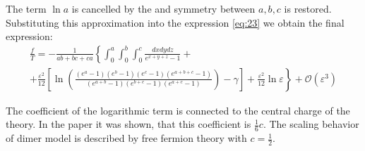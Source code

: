 \documentclass{article}
\begin{document}
  

The term $\ln a$ is cancelled by the  and symmetry between $a,b,c$ is restored.
Substituting this approximation into the expression \eqref{eq:23} we obtain 
 the final expression:
\begin{multline}
  \label{eq:3}
  \frac{f}{T}=-\frac{1}{ab+bc+ca}\left\{\int_{0}^{a} \int_{0}^{b}\int_{0}^{c}\frac{dx dy dz}{e^{x+y+z}-1}+\right.\\
  \left.+\frac{\varepsilon^{2}}{12}\left[\ln\left(\frac{(e^{a}-1)(e^{b}-1)(e^{c}-1)(e^{a+b+c}-1)}{(e^{a+b}-1)(e^{b+c}-1)(e^{a+c}-1)}\right)-
      \gamma\right]+\frac{\varepsilon^{2}}{12}\ln \varepsilon\right\} +\mathcal{O}(\varepsilon^{3})
\end{multline}

The coefficient of the logarithmic term is connected to the central charge of the theory. In the
paper \cite{cardy1988finite} it was shown, that this coefficient is $\frac{1}{6}c$. The scaling
behavior of dimer model is described by free fermion theory with $c=\frac{1}{2}$.
\end{document}
